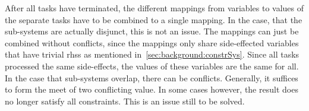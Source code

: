     After all tasks have terminated, the different mappings from variables to values of the separate tasks have to be combined to a single mapping. In the case, that the sub-systems are actually disjunct, this is not an issue. The mappings can just be combined without conflicts, since the mappings only share side-effected variables that have trivial \acp{rhs} as mentioned in~\autoref{sec:background:constrSys}. Since all tasks processed the same side-effects, the values of these variables are the same for all.
    In the case that sub-systems overlap, there can be conflicts. Generally, it suffices to form the meet of two conflicting value. In some cases however, the result does no longer satisfy all constraints. This is an issue still to be solved.
